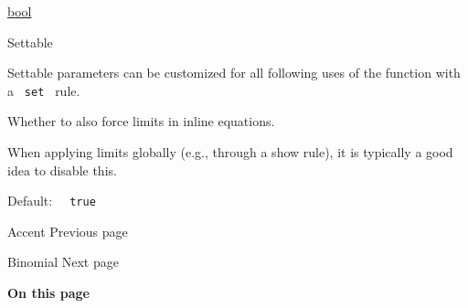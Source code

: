\href{/docs/reference/foundations/bool/}{bool}

{{ Settable }}

\label{functions-limits-inline-settable-tooltip}
Settable parameters can be customized for all following uses of the
function with a \texttt{\ set\ } rule.

Whether to also force limits in inline equations.

When applying limits globally (e.g., through a show rule), it is
typically a good idea to disable this.

Default: \texttt{\ }{\texttt{\ true\ }}\texttt{\ }

\href{/docs/reference/math/accent/}{\pandocbounded{}}

{ Accent } { Previous page }

\href{/docs/reference/math/binom/}{\pandocbounded{}}

{ Binomial } { Next page }

\textbf{On this page}

